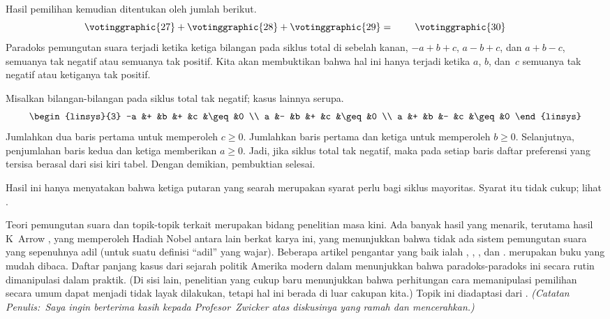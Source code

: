 Hasil pemilihan kemudian ditentukan oleh jumlah berikut.
\begin{equation*}
  \votinggraphic{27}  %
  +  
  \votinggraphic{28}  %
  +  
  \votinggraphic{29}  %
  =\hspace{.30in}
  \votinggraphic{30}  %
  \hspace{.30in}\hbox{}
\end{equation*}
Paradoks pemungutan suara terjadi ketika ketiga bilangan pada siklus total di sebelah kanan,
$-a+b+c$, $a-b+c$, dan $a+b-c$,
semuanya tak negatif atau semuanya tak positif.
Kita akan membuktikan bahwa hal ini hanya terjadi ketika
$a$, $b$, dan~$c$ semuanya tak negatif atau ketiganya tak positif.

Misalkan bilangan-bilangan pada siklus total tak negatif; kasus lainnya serupa.
\begin{equation*}
  \begin{linsys}{3}
    -a &+ &b &+ &c &\geq &0 \\
     a &- &b &+ &c &\geq &0 \\
     a &+ &b &- &c &\geq &0 
  \end{linsys}
\end{equation*}
Jumlahkan dua baris pertama untuk memperoleh $c\geq 0$.
Jumlahkan baris pertama dan ketiga untuk memperoleh $b\geq 0$.
Selanjutnya, penjumlahan baris kedua dan ketiga memberikan $a\geq 0$.
Jadi, jika siklus total tak negatif, maka pada setiap baris daftar
preferensi yang tersisa berasal dari sisi kiri tabel.
Dengan demikian, pembuktian selesai.

Hasil ini hanya menyatakan bahwa ketiga putaran yang searah merupakan
syarat perlu bagi siklus mayoritas.
Syarat itu tidak cukup; lihat
.

Teori pemungutan suara dan topik-topik terkait merupakan bidang penelitian masa kini.
Ada banyak hasil yang menarik, terutama
hasil K~Arrow \cite{Arrow}, yang memperoleh Hadiah Nobel antara lain berkat
karya ini, yang menunjukkan bahwa tidak ada sistem pemungutan suara yang sepenuhnya adil
(untuk suatu definisi ``adil'' yang wajar).
Beberapa artikel pengantar yang baik ialah \cite{Gardner70},
\cite{Gardner74}, \cite{Gardner80}, dan \cite{NeimiRiker}.
\cite{Taylor} merupakan buku yang mudah dibaca.
Daftar panjang kasus dari sejarah politik Amerika modern dalam
\cite{GamingVote} menunjukkan bahwa paradoks-paradoks ini
secara rutin dimanipulasi dalam praktik.
(Di sisi lain, penelitian yang cukup baru menunjukkan bahwa
perhitungan cara memanipulasi pemilihan secara umum dapat menjadi tidak layak dilakukan,
tetapi hal ini berada di luar cakupan kita.)
Topik ini diadaptasi dari \cite{Zwicker}.
\emph{(Catatan Penulis:~Saya ingin berterima kasih kepada Profesor~Zwicker
atas diskusinya yang ramah dan mencerahkan.)}

